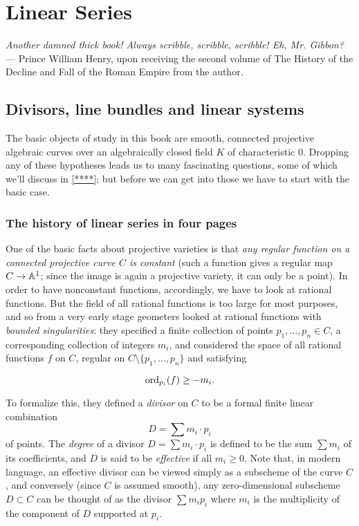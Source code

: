 


\chapter{Linear Series}

\begin{center}
\emph{Another damned thick book! Always scribble, scribble, scribble! Eh, Mr. Gibbon?} --- \scriptsize{Prince William Henry, upon receiving the second  volume of The History of the Decline and Fall of the Roman Empire from the author.}
\end{center}


\section{Divisors, line bundles and linear systems}


The basic objects of study in this book are smooth, connected projective algebraic curves over an algebraically closed field $K$ of characteristic 0. Dropping any of these hypotheses leads us to many fascinating questions, some of which we'll discuss in \ref{****}; but before we can get into those we have to start with the basic case.


\subsection{The history of linear series in four pages}

One of the basic facts about projective varieties is that \emph{any regular function on a connected projective curve $C$ is constant} (such a function gives a regular map $C \to \AA^1$; since the image is again a projective variety, it can only be a point).  In order to have nonconstant functions, accordingly, we have to look at rational functions. But the field of all rational functions is too large for most purposes, and so from a very early stage geometers looked at rational functions with \emph{bounded singularities}: they specified a finite collection of points $p_1,\dots,p_n \in C$, a corresponding collection of integers $m_i$, and considered the space of all rational functions $f$ on $C$, regular on $C \setminus \{p_1,\dots,p_n\}$  and satisfying

\begin{equation}\label{divisor condition}
\ord_{p_i}(f) \geq -m_i.
\end{equation}

To formalize this, they defined a \emph{divisor} on $C$ to be a formal finite linear combination
$$
D = \sum m_i \cdot p_i
$$
of points. The \emph{degree} of a divisor $D = \sum m_i \cdot p_i$ is defined to be the sum $\sum m_i$ of its coefficients, and $D$ is said to be \emph{effective} if all $m_i \geq 0$. Note that, in modern language, an effective divisor can be viewed simply as a subscheme of the curve $C$, and conversely (since $C$ is assumed smooth), any zero-dimensional subscheme $D \subset C$ can be thought of as the divisor $\sum m_ip_i$ where $m_i$ is the multiplicity of the component of $D$ supported at $p_i$.

